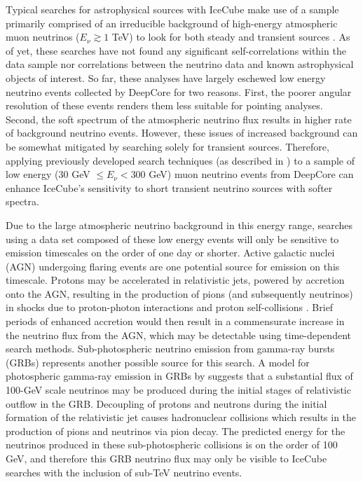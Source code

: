 \documentclass[manuscript]{aastex}
\begin{document}
Typical searches for astrophysical sources with IceCube make use of a sample primarily comprised of an irreducible background of high-energy atmospheric muon neutrinos ($E_{\nu} \gtrsim 1$ TeV) to look for both steady \citep{2014ApJ...796..109A} and transient sources \citep{0004-637X-807-1-46}. As of yet, these searches have not found any significant self-correlations within the data sample nor correlations between the neutrino data and known astrophysical objects of interest. So far, these analyses have largely eschewed low energy neutrino events collected by DeepCore for two reasons. First, the poorer angular resolution of these events renders them less suitable for pointing analyses. Second, the soft spectrum of the atmospheric neutrino flux results in higher rate of background neutrino events. However, these issues of increased background can be somewhat mitigated by searching solely for transient sources. Therefore, applying previously developed search techniques (as described in \cite{2010APh....33..175B}) to a sample of low energy (30 GeV $\leq E_{\nu} < 300$ GeV) muon neutrino events from DeepCore can enhance IceCube's sensitivity to short transient neutrino sources with softer spectra.

Due to the large atmospheric neutrino background in this energy range, searches using a data set composed of these low energy events will only be sensitive to emission timescales on the order of one day or shorter. Active galactic nuclei (AGN) undergoing flaring events are one potential source for emission on this timescale. Protons may be accelerated in relativistic jets, powered by accretion onto the AGN, resulting in the production of pions (and subsequently neutrinos) in shocks due to proton-photon interactions and proton self-collisions \citep{2009APh....31..138B}. Brief periods of enhanced accretion would then result in a commensurate increase in the neutrino flux from the AGN, which may be detectable using time-dependent search methods. Sub-photospheric neutrino emission from gamma-ray bursts (GRBs) represents another possible source for this search. A model for photospheric gamma-ray emission in GRBs by \cite{2013PhRvL.111m1102M} suggests that a substantial flux of 100-GeV scale neutrinos may be produced during the initial stages of relativistic outflow in the GRB. Decoupling of protons and neutrons during the initial formation of the relativistic jet causes hadronuclear collisions which results in the production of pions and neutrinos via pion decay. The predicted energy for the neutrinos produced in these sub-photospheric collisions is on the order of 100 GeV, and therefore this GRB neutrino flux may only be visible to IceCube searches with the inclusion of sub-TeV neutrino events. 
\end{document}
